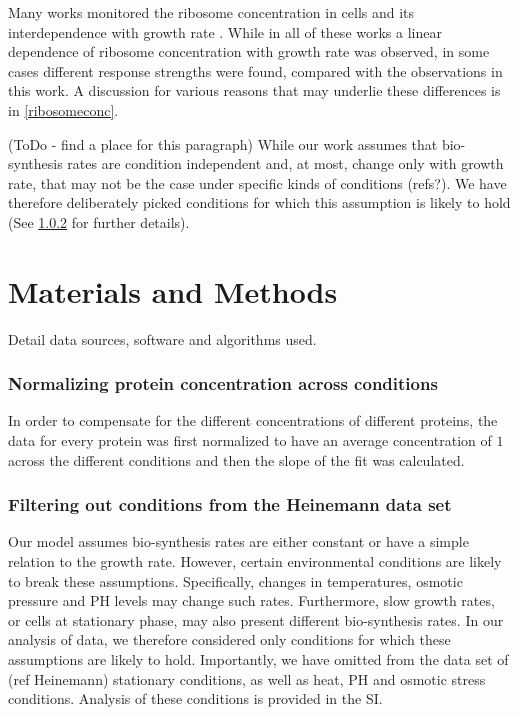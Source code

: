 \documentclass[notitlepage]{article}
\begin{document}
Many works monitored the ribosome concentration in cells and its interdependence with growth rate \parencite{Scott2010, Bremer1987, Schaechter1958, 1974, Zaslaver2009, eco-sal}.
While in all of these works a linear dependence of ribosome concentration with growth rate was observed, in some cases different response strengths were found, compared with the observations in this work.
A discussion for various reasons that may underlie these differences is in \ref{ribosomeconc}.

(ToDo - find a place for this paragraph)
While our work assumes that bio-synthesis rates are condition independent and, at most, change only with growth rate, that may not be the case under specific kinds of conditions (refs?).
We have therefore deliberately picked conditions for which this assumption is likely to hold (See \ref{heinemanncond} for further details).

\section{Materials and Methods}
Detail data sources, software and algorithms used.
\subsubsection{Normalizing protein concentration across conditions}
\label{concacrossconds}
In order to compensate for the different concentrations of different proteins, the data for every protein was first normalized to have an average concentration of $1$ across the different conditions and then the slope of the fit was calculated.

\subsubsection{Filtering out conditions from the Heinemann data set}
\label{heinemanncond}
Our model assumes bio-synthesis rates are either constant or have a simple relation to the growth rate.
However, certain environmental conditions are likely to break these assumptions.
Specifically, changes in temperatures, osmotic pressure and PH levels may change such rates.
Furthermore, slow growth rates, or cells at stationary phase, may also present different bio-synthesis rates.
In our analysis of data, we therefore considered only conditions for which these assumptions are likely to hold.
Importantly, we have omitted from the data set of (ref Heinemann) stationary conditions, as well as heat, PH and osmotic stress conditions.
Analysis of these conditions is provided in the SI.
\end{document}
